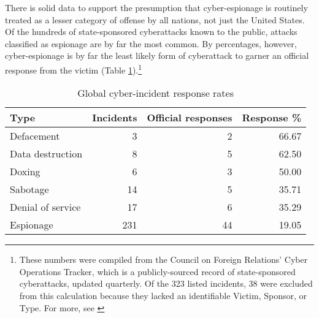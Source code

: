 \documentclass[14pt]{extarticle}
\begin{document}
There is solid data to support the presumption that cyber-espionage is routinely treated as a lesser category of offense by all nations, not just the United States. Of the hundreds of state-sponsored cyberattacks known to the public, attacks classified as espionage are by far the most common. By percentages, however, cyber-espionage is by far the least likely form of cyberattack to garner an official response from the victim (Table \ref{response-pct}).\footnote{These numbers were compiled from the Council on Foreign Relations' Cyber Operations Tracker, which is a publicly-sourced record of state-sponsored cyberattacks, updated quarterly. Of the 323 listed incidents, 38 were excluded from this calculation because they lacked an identifiable Victim, Sponsor, or Type. For more, see \cite{council_on_foreign_relations_new_2019}}

\begin{table}[ht]
\centering
\begin{tabular}{lrrr}
  \hline
Type & Incidents & Official responses & Response \% \\
  \hline
Defacement &   3 &   2 & 66.67 \\
  Data destruction &   8 &   5 & 62.50 \\
  Doxing &   6 &   3 & 50.00 \\
  Sabotage &  14 &   5 & 35.71 \\
  Denial of service &  17 &   6 & 35.29 \\
  Espionage & 231 &  44 & 19.05 \\
   \hline
\end{tabular}
\caption{Global cyber-incident response rates}
\label{response-pct}
\end{table}

\end{document}
